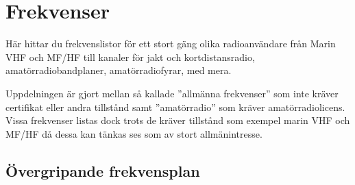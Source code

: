 
\chapter{Frekvenser}

Här hittar du frekvenslistor för ett stort gäng olika radioanvändare från
Marin VHF och MF/HF till kanaler för jakt och kortdistansradio,
amatörradiobandplaner, amatörradiofyrar, med mera.

Uppdelningen är gjort mellan så kallade ''allmänna frekvenser'' som inte kräver
certifikat eller andra tillstånd samt ''amatörradio'' som kräver
amatörradiolicens. Vissa frekvenser listas dock trots de kräver tillstånd som
exempel marin VHF och MF/HF då dessa kan tänkas ses som av stort
allmänintresse.

\clearpage

\section{Övergripande frekvensplan}

